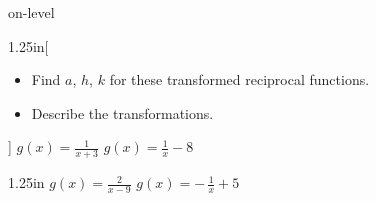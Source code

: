 \begin{taggedblock}{on-level}



\begin{my2Problems}[\Large]{1.25in}[%
    \begin{itemize}[nosep]
        \item Find $a$, $h$, $k$ for these transformed reciprocal functions.
        \item Describe the transformations.
    \end{itemize}]
    {
        $g(x) = \frac{1}{x+3}$
    }
    {
        $g(x) = \frac{1}{x} - 8$
    }
\end{my2Problems}
\begin{my2Problems}[\Large]{1.25in}
    {
        $g(x) = \frac{2}{x-9}$
    }
    {
        $g(x)   = -\,\frac{1}{x} + 5$
    }
\end{my2Problems}




\end{taggedblock}
